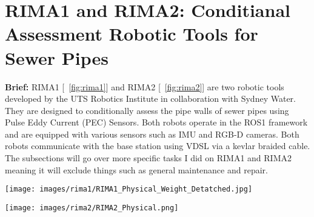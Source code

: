 \section{RIMA1 and RIMA2: Conditianal Assessment Robotic Tools for Sewer Pipes}

\label{sec:industry}

\textbf{Brief: } RIMA1 [~\ref{fig:rima1}] and RIMA2 [~\ref{fig:rima2}] are two robotic tools developed by the UTS Robotics Institute in collaboration with Sydney Water. They are designed to conditionally assess the pipe walls of sewer 
pipes using Pulse Eddy Current (PEC) Sensors. Both robots operate in the ROS1 framework and are equipped with various sensors such as IMU and RGB-D cameras. Both robots communicate with the base station using VDSL via a 
kevlar braided cable. The subsections will go over more specific tasks I did on RIMA1 and RIMA2 meaning it will exclude things such as general maintenance and repair.

\begin{figure*}[htbp]
    \centering
    \begin{minipage}[t]{0.48\textwidth}
        \centering
        \texttt{[image: images/rima1/RIMA1\_Physical\_Weight\_Detatched.jpg]}
        \caption{RIMA1}
        \label{fig:rima1}
    \end{minipage}
    \hfill
    \begin{minipage}[t]{0.48\textwidth}
        \centering
        \texttt{[image: images/rima2/RIMA2\_Physical.png]}
        \caption{RIMA2}
        \label{fig:rima2}
    \end{minipage}
\end{figure*}



   